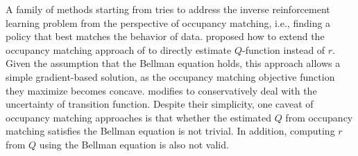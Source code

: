 A family of methods starting from \cite{ho2016generative} tries to address the inverse reinforcement learning problem from the perspective of occupancy matching, i.e., finding a policy that best matches the behavior of data. \cite{garg2021iq} proposed how to extend the occupancy matching approach of \cite{ho2016generative} to directly estimate $Q$-function instead of $r$. Given the assumption that the Bellman equation holds, this approach allows a simple gradient-based solution, as the occupancy matching objective function they maximize becomes concave. \cite{yue2023clare} modifies \cite{ho2016generative} to conservatively deal with the uncertainty of transition function. Despite their simplicity, one caveat of occupancy matching approaches is that whether the estimated $Q$ from occupancy matching satisfies the Bellman equation is not trivial. %
In addition, computing $r$ from $Q$ using the Bellman equation is also not valid.